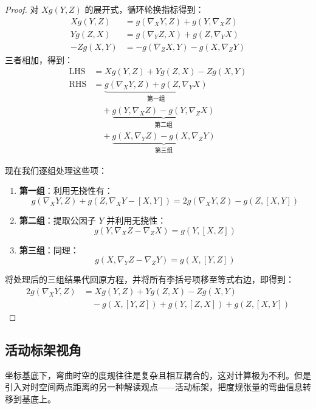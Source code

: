 \begin{proof}
    对 $X g(Y, Z)$ 的展开式，循环轮换指标得到：
    \begin{align}
        X g(Y, Z) &= g(\nabla_X Y, Z) + g(Y, \nabla_X Z) \label{eq:k1} \\
        Y g(Z, X) &= g(\nabla_Y Z, X) + g(Z, \nabla_Y X) \label{eq:k2} \\
        -Z g(X, Y) &= -g(\nabla_Z X, Y) - g(X, \nabla_Z Y) \label{eq:k3}
    \end{align}
    三者相加，得到：
    \begin{equation}
    \begin{aligned}
        \text{LHS} &= X g(Y, Z) + Y g(Z, X) - Z g(X, Y) \\
        \text{RHS} &= \underbrace{g(\nabla_X Y, Z) + g(Z, \nabla_Y X)}_{\text{第一组}} \\
                    &\quad + \underbrace{g(Y, \nabla_X Z) - g(Y, \nabla_Z X)}_{\text{第二组}} \\
                    &\quad + \underbrace{g(X, \nabla_Y Z) - g(X, \nabla_Z Y)}_{\text{第三组}}
    \end{aligned}
    \end{equation}

    现在我们逐组处理这些项：
    \begin{enumerate}
        \item \textbf{第一组}：利用无挠性有：
        \[ g(\nabla_X Y, Z) + g(Z, \nabla_X Y - [X, Y]) = 2g(\nabla_X Y, Z) - g(Z, [X, Y]) \]
        \item \textbf{第二组}：提取公因子 $Y$ 并利用无挠性：
        \[ g(Y, \nabla_X Z - \nabla_Z X) = g(Y, [X, Z]) \]
        \item \textbf{第三组}：同理：
        \[ g(X, \nabla_Y Z - \nabla_Z Y) = g(X, [Y, Z]) \]
    \end{enumerate}

    将处理后的三组结果代回原方程，并将所有李括号项移至等式右边，即得到：
    \begin{equation}
    \begin{split}
        2g(\nabla_X Y, Z) &= X g(Y, Z) + Y g(Z, X) - Z g(X, Y) \\
        &\quad - g(X, [Y, Z]) + g(Y, [Z, X]) + g(Z, [X, Y])
    \end{split}
    \end{equation}
\end{proof}

\newpage
\subsection{活动标架视角}
坐标基底下，弯曲时空的度规往往是复杂且相互耦合的，这对计算极为不利。但是引入对时空间两点距离的另一种解读观点——活动标架，把度规张量的弯曲信息转移到基底上。

